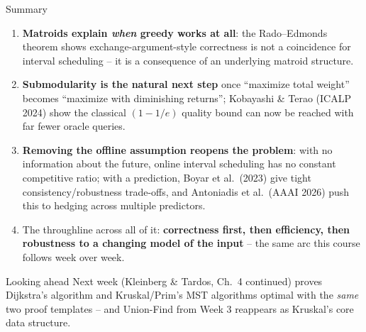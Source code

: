 \documentclass[11pt,aspectratio=169]{beamer}
\begin{document}
\begin{frame}{Summary}
  \footnotesize
  \begin{enumerate}
    \item \textbf{Matroids explain \emph{when} greedy works at all}: the Rado--Edmonds
    theorem shows exchange-argument-style correctness is not a coincidence for
    interval scheduling -- it is a consequence of an underlying matroid structure.
    \item \textbf{Submodularity is the natural next step} once ``maximize total
    weight'' becomes ``maximize with diminishing returns''; Kobayashi \& Terao (ICALP
    2024) show the classical $(1-1/e)$ quality bound can now be reached with far fewer
    oracle queries.
    \item \textbf{Removing the offline assumption reopens the problem}: with no
    information about the future, online interval scheduling has no constant
    competitive ratio; with a prediction, Boyar et al.\ (2023) give tight
    consistency/robustness trade-offs, and Antoniadis et al.\ (AAAI 2026) push this to
    hedging across multiple predictors.
    \item The throughline across all of it: \textbf{correctness first, then
    efficiency, then robustness to a changing model of the input} -- the same arc this
    course follows week over week.
  \end{enumerate}
  \begin{alertblock}{Looking ahead}
    Next week (Kleinberg \& Tardos, Ch.\ 4 continued) proves Dijkstra's algorithm and
    Kruskal/Prim's MST algorithms optimal with the \emph{same} two proof templates --
    and Union-Find from Week 3 reappears as Kruskal's core data structure.
  \end{alertblock}
\end{frame}
\end{document}

